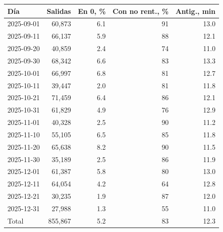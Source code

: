 \begin{tabular}{@{}lrrrr@{}}
\toprule
Día & Salidas & En 0, \% & Con no rent., \% & Antig., min \\
\midrule
2025-09-01 & 60,873 & 6.1 & 91 & 13.0 \\
2025-09-11 & 66,137 & 5.9 & 88 & 12.1 \\
2025-09-20 & 40,859 & 2.4 & 74 & 11.0 \\
2025-09-30 & 68,342 & 6.6 & 83 & 13.3 \\
2025-10-01 & 66,997 & 6.8 & 81 & 12.7 \\
2025-10-11 & 39,447 & 2.0 & 81 & 11.8 \\
2025-10-21 & 71,459 & 6.4 & 86 & 12.1 \\
2025-10-31 & 61,829 & 4.9 & 76 & 12.9 \\
2025-11-01 & 40,328 & 2.5 & 90 & 11.2 \\
2025-11-10 & 55,105 & 6.5 & 85 & 11.8 \\
2025-11-20 & 65,638 & 8.2 & 90 & 11.5 \\
2025-11-30 & 35,189 & 2.5 & 86 & 11.9 \\
2025-12-01 & 61,387 & 5.8 & 80 & 13.0 \\
2025-12-11 & 64,054 & 4.2 & 64 & 12.8 \\
2025-12-21 & 30,235 & 1.9 & 87 & 12.0 \\
2025-12-31 & 27,988 & 1.3 & 55 & 11.0 \\
\midrule
Total & 855,867 & 5.2 & 83 & 12.3 \\
\bottomrule
\end{tabular}
